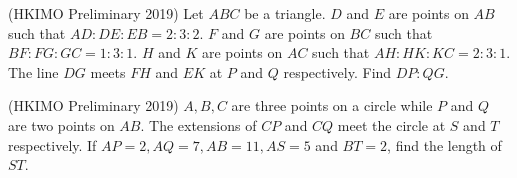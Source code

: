\documentclass[11pt]{scrartcl}
\begin{document}
    \begin{soalbaru}
    (HKIMO Preliminary 2019) Let $ABC$ be a triangle. $D$ and $E$ are points on $AB$ such that $AD:DE:EB=2:3:2$. $F$ and $G$ are points on $BC$ such that $BF:FG:GC=1:3:1$. $H$ and $K$ are points on $AC$ such that $AH:HK:KC=2:3:1$. The line $DG$ meets $FH$ and $EK$ at $P$ and $Q$ respectively. Find $DP:QG$.
    \end{soalbaru}
    
    \begin{soalbaru}
    (HKIMO Preliminary 2019) $A, B, C$ are three points on a circle while $P$ and $Q$ are two points on $AB$. The extensions of $CP$ and $CQ$ meet the circle at $S$ and $T$ respectively. If $AP = 2, AQ = 7, AB = 11, AS = 5$ and $BT = 2$, find the length of $ST$.
    \end{soalbaru}
	
\end{document}
